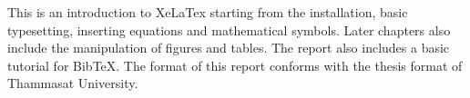 
This is an introduction to XeLaTex starting from the installation, basic typesetting, inserting equations and mathematical symbols. Later chapters also include the manipulation of figures and tables. The report also includes a basic tutorial for BibTeX. The format of this report conforms with the thesis format of Thammasat University.

